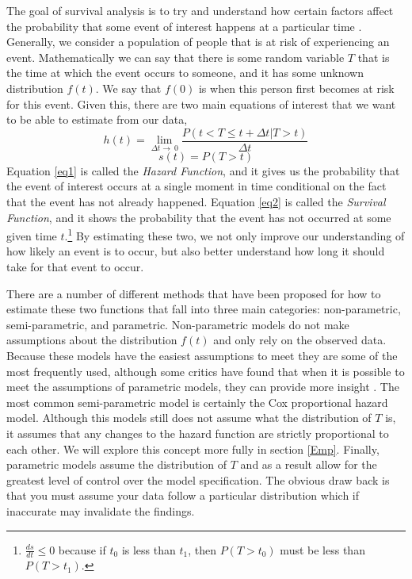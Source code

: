 \documentclass{article}
\begin{document}
The goal of survival analysis is to try and understand how certain factors affect the probability that some event of interest happens at a particular time \parencite{oakes}. Generally, we consider a population of people that is at risk of experiencing an event. Mathematically we can say that there is some random variable $T$ that is the time at which the event occurs to someone, and it has some unknown distribution $f(t)$. We say that $f(0)$ is when this person first becomes at risk for this event. Given this, there are two main equations of interest that we want to be able to estimate from our data,  
\begin{equation}
    \label{eq1}
    h(t)=\lim_{\Delta t\to\ 0}\frac{P(t<T\leq t+\Delta t|T>t)}{\Delta t}
\end{equation}
\begin{equation}
    \label{eq2}
    s(t)=P(T>t)
\end{equation}
Equation \ref{eq1} is called the \emph{Hazard Function}, and it gives us the probability that the event of interest occurs at a single moment in time conditional  on the fact that the event has not already happened. Equation \ref{eq2} is called the \emph{Survival Function}, and it shows the probability that the event has not occurred at some given time $t$.\footnote{$\frac{ds}{dt} \leq 0$ because if $t_0$ is less than $t_1$, then $P(T>t_0)$ must be less than $P(T>t_1)$.} By estimating these two, we not only improve our understanding of how likely an event is to occur, but also better understand how long it should take for that event to occur. 

There are a number of different methods that have been proposed for how to estimate these two functions that fall into three main categories: non-parametric, semi-parametric, and parametric. Non-parametric models do not make assumptions about the distribution $f(t)$ and only rely on the observed data. Because these models have the easiest assumptions to meet they are some of the most frequently used, although some critics have found that when it is possible to meet the assumptions of parametric models, they can provide more insight \parencite{miller}. The most common semi-parametric model is certainly the Cox proportional hazard model. Although this models still does not assume what the distribution of $T$ is, it assumes that any changes to the hazard function are strictly proportional to each other. We will explore this concept more fully in section \ref{Emp}. Finally, parametric models assume the distribution of $T$ and as a result allow for the greatest level of control over the model specification. The obvious draw back is that you must assume your data follow a particular distribution which if inaccurate may invalidate the findings. 
\end{document}
